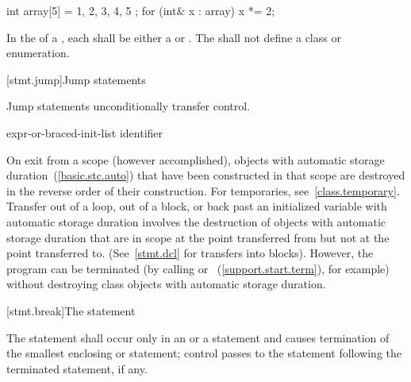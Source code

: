 \enterexample
\begin{codeblock}
int array[5] = { 1, 2, 3, 4, 5 };
for (int& x : array)
  x *= 2;
\end{codeblock}
\exitexample%

\pnum
In the  of a ,
each  shall be either a 
or . The  shall not define a
class or enumeration.

[stmt.jump]{Jump statements}%

\pnum
Jump statements unconditionally transfer control.
%

%
%
%
%
%
%
\begin{bnf}
\br
    \br
    \br
     expr-or-braced-init-list\opt \terminal{;}\br
     identifier \terminal{;}
\end{bnf}

\pnum
{}%
%
On exit from a scope (however accomplished), objects with automatic storage
duration~(\ref{basic.stc.auto}) that have been constructed in that scope are destroyed
in the reverse order of their construction. \enternote For temporaries,
see~\ref{class.temporary}. \exitnote Transfer out of a loop, out of a block, or back
past
an initialized variable with automatic storage duration involves the
destruction of objects with automatic storage duration that are in
scope at the point transferred from but not at the point transferred to.
(See~\ref{stmt.dcl} for transfers into blocks).
\enternote
However, the program can be terminated (by calling
%
%
 or
%
%
~(\ref{support.start.term}), for example) without
destroying class objects with automatic storage duration.
\exitnote

[stmt.break]{The  statement}%

\pnum
The  statement shall occur only in an
%
%
 or a  statement and causes
termination of the smallest enclosing  or
 statement; control passes to the statement following the
terminated statement, if any.

